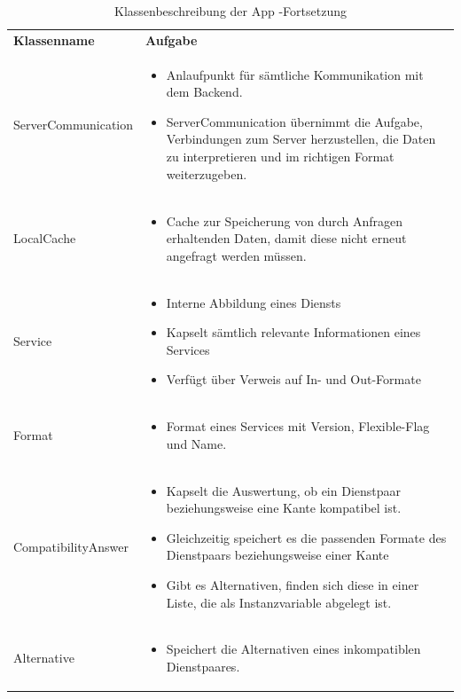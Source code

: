 \begin{table}
	\begin{tabularx}{\textwidth}{p{} | X}
\rowcolor[HTML]{C0C0C0}
		\textbf{Klassenname} & \textbf{Aufgabe} \\
		ServerCommunication & \begin{itemize} \item Anlaufpunkt für sämtliche Kommunikation mit dem Backend. 
\item ServerCommunication übernimmt die Aufgabe, Verbindungen zum Server herzustellen, die Daten zu interpretieren und im richtigen Format weiterzugeben. \end{itemize}\\
			\rowcolor[HTML]{E7E7E7} 		
		LocalCache & \begin{itemize} 
		\item Cache zur Speicherung von durch Anfragen erhaltenden Daten, damit diese nicht erneut angefragt werden müssen. 
		\end{itemize}\\
Service & \begin{itemize} \item Interne Abbildung eines Diensts
\item Kapselt sämtlich relevante Informationen eines Services
\item Verfügt über Verweis auf In- und Out-Formate
\end{itemize}\\
\rowcolor[HTML]{E7E7E7} 
Format & \begin{itemize}	\item Format eines Services mit Version, Flexible-Flag und Name.
		\end{itemize}\\
CompatibilityAnswer & \begin{itemize}
\item Kapselt die Auswertung, ob ein Dienstpaar beziehungsweise eine Kante kompatibel ist. 
\item Gleichzeitig speichert es die passenden Formate des Dienstpaars beziehungsweise einer Kante
\item Gibt es Alternativen, finden sich diese in einer Liste, die als Instanzvariable abgelegt ist.
\end{itemize}\\		
\rowcolor[HTML]{E7E7E7} 		
Alternative & \begin{itemize}
\item Speichert die Alternativen eines inkompatiblen Dienstpaares.
\end{itemize}\\		
	\end{tabularx}
	\caption{Klassenbeschreibung der App -Fortsetzung}
	\label{table:klassenbeschreibung-a}
\end{table}